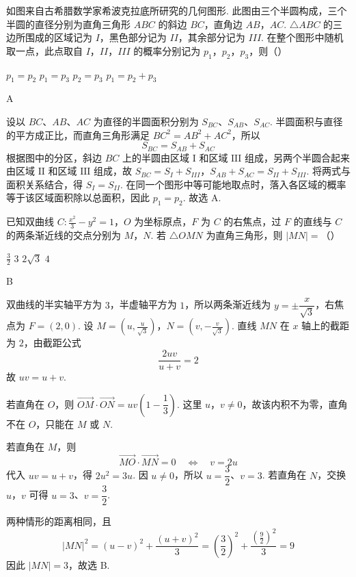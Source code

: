 \begin{problem}
如图来自古希腊数学家希波克拉底所研究的几何图形. 此图由三个半圆构成，三个半圆的直径分别为直角三角形 \(ABC\) 的斜边 \(BC\)，直角边 \(AB\)，\(AC\). \(\triangle ABC\) 的三边所围成的区域记为 \(I\)，黑色部分记为 \(II\)，其余部分记为 \(III\). 在整个图形中随机取一点，此点取自 \(I\)，\(II\)，\(III\) 的概率分别记为 \(p_1\)，\(p_2\)，\(p_3\)，则（\quad）


\choices
    {\(p_1=p_2\)}
    {\(p_1=p_3\)}
    {\(p_2=p_3\)}
    {\(p_1=p_2+p_3\)}
\end{problem}

\begin{answer}
A
\end{answer}

\begin{solution}
设以 \(BC\)、\(AB\)、\(AC\) 为直径的半圆面积分别为 \(S_{BC}\)、\(S_{AB}\)、\(S_{AC}\). 半圆面积与直径的平方成正比，而直角三角形满足 \(BC^2=AB^2+AC^2\)，所以
\[
S_{BC}=S_{AB}+S_{AC}
\]
根据图中的分区，斜边 \(BC\) 上的半圆由区域 \(\mathrm{I}\) 和区域 \(\mathrm{III}\) 组成，另两个半圆合起来由区域 \(\mathrm{II}\) 和区域 \(\mathrm{III}\) 组成，故 \(S_{BC}=S_I+S_{III}\)，\(S_{AB}+S_{AC}=S_{II}+S_{III}\). 将两式与面积关系结合，得 \(S_I=S_{II}\). 在同一个图形中等可能地取点时，落入各区域的概率等于该区域面积除以总面积，因此 \(p_1=p_2\). 故选 A.
\end{solution}

\begin{problem}
已知双曲线 \(C:\frac{x^2}{3}-y^2=1\)，\(O\) 为坐标原点，\(F\) 为 \(C\) 的右焦点，过 \(F\) 的直线与 \(C\) 的两条渐近线的交点分别为 \(M\)，\(N\). 若 \(\triangle OMN\) 为直角三角形，则 \(\lvert MN\rvert=\)（\quad）

\choices
    {\(\frac32\)}
    {\(3\)}
    {\(2\sqrt3\)}
    {\(4\)}
\end{problem}

\begin{answer}
B
\end{answer}

\begin{solution}
双曲线的半实轴平方为 \(3\)，半虚轴平方为 \(1\)，所以两条渐近线为 \(y=\pm\dfrac{x}{\sqrt3}\)，右焦点为 \(F=(2,0)\). 设
\(M=\left(u,\frac{u}{\sqrt3}\right)\)，\(N=\left(v,-\frac{v}{\sqrt3}\right)\).
直线 \(MN\) 在 \(x\) 轴上的截距为 \(2\)，由截距公式
\[
\frac{2uv}{u+v}=2
\]
故 \(uv=u+v\).

若直角在 \(O\)，则 \(\overrightarrow{OM}\cdot\overrightarrow{ON}=uv\left(1-\dfrac13\right)\). 这里 \(u\)，\(v\ne0\)，故该内积不为零，直角不在 \(O\)，只能在 \(M\) 或 \(N\).

若直角在 \(M\)，则
\[
\overrightarrow{MO}\cdot\overrightarrow{MN}=0
\quad\Longleftrightarrow\quad
v=2u
\]
代入 \(uv=u+v\)，得 \(2u^2=3u\). 因 \(u\ne0\)，所以 \(u=\dfrac32\)、\(v=3\). 若直角在 \(N\)，交换 \(u\)，\(v\) 可得 \(u=3\)、\(v=\dfrac32\).

两种情形的距离相同，且
\[
\lvert MN\rvert^2=(u-v)^2+\frac{(u+v)^2}{3}
 =\left(\frac32\right)^2+\frac{\left(\frac92\right)^2}{3}=9
\]
因此 \(\lvert MN\rvert=3\)，故选 B.
\end{solution}

